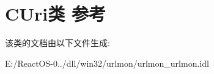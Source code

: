 \hypertarget{class_c_uri}{}\section{C\+Uri类 参考}
\label{class_c_uri}


该类的文档由以下文件生成\+:\begin{DoxyCompactItemize}
\item 
E\+:/\+React\+O\+S-\/0../dll/win32/urlmon/urlmon\+\_\+urlmon.\+idl\end{DoxyCompactItemize}
